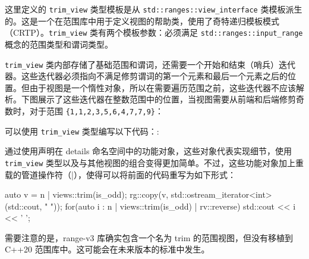 
这里定义的 \verb|trim_view| 类型模板是从 \verb|std::ranges::view_interface| 类模板派生的。这是一个在范围库中用于定义视图的帮助类，使用了奇特递归模板模式（CRTP）。\verb|trim_view| 类有两个模板参数：必须满足 \verb|std::ranges::input_range| 概念的范围类型和谓词类型。

\verb|trim_view| 类内部存储了基础范围和谓词，还需要一个开始和结束（哨兵）迭代器。这些迭代器必须指向不满足修剪谓词的第一个元素和最后一个元素之后的位置。但由于视图是一个惰性对象，所以在需要遍历范围之前，这些迭代器不应该解析。下图展示了这些迭代器在整数范围中的位置，当视图需要从前端和后端修剪奇数时，对于范围 \verb|{1,1,2,3,5,6,4,7,7,9}|：

可以使用 \verb|trim_view| 类型编写以下代码：:


通过使用声明在 details 命名空间中的功能对象，这些对象代表实现细节，使用 \verb|trim_view| 类型以及与其他视图的组合变得更加简单。不过，这些功能对象加上重载的管道操作符（|），使得可以将前面的代码重写为如下形式：

\begin{cpp}
auto v = n | views::trim(is_odd);
rg::copy(v, std::ostream_iterator<int>(std::cout, " "));
for(auto i : n | views::trim(is_odd) | rv::reverse)
    std::cout << i << ' ';
\end{cpp}

需要注意的是，range-v3 库确实包含一个名为 trim 的范围视图，但没有移植到 C++20 范围库中。这可能会在未来版本的标准中发生。


